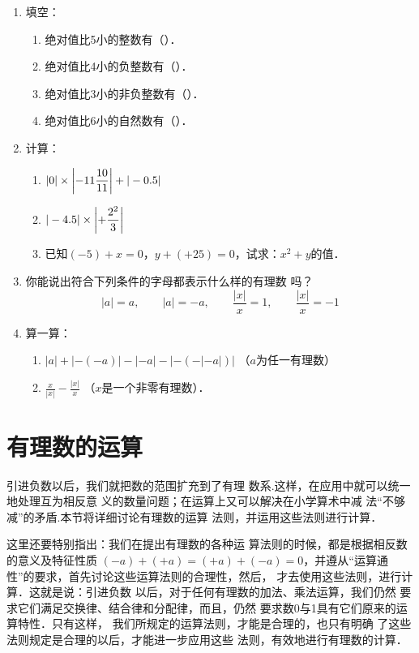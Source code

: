 \begin{enumerate}
\item 填空：
\begin{enumerate}
    \item 绝对值比5小的整数有（\qquad \qquad ）．
    \item 绝对值比4小的负整数有（\qquad \qquad ）．
    \item 绝对值比3小的非负整数有（\qquad \qquad ）．
    \item 绝对值比6小的自然数有（\qquad \qquad ）．
\end{enumerate}


\item 计算：
\begin{enumerate}
    \item $|0|\times \left|-11\dfrac{10}{11}\right|+|-0.5|$
    \item $|-4.5|\times\left|+\dfrac{2^2}{3}\right|$
    \item 已知$(-5)+x=0$，$y+(+25)=0$，试求：$x^2+y$的值．
\end{enumerate}

\item 你能说出符合下列条件的字母都表示什么样的有理数
吗？
\[|a|=a,\qquad |a|=-a,\qquad \frac{|x|}{x}=1,\qquad \frac{|x|}{x}=-1  \]

\item 算一算：
\begin{enumerate}
    \item $|a|+|-(-a)|-|-a|-|-(-|-a|)|$ （$a$为任一有理数）
    \item $\frac{x}{|x|}-\frac{|x|}{x}$ （$x$是一个非零有理数）．
\end{enumerate}

\end{enumerate}

\section{有理数的运算}
引进负数以后，我们就把数的范围扩充到了有理
数系.这样，在应用中就可以统一地处理互为相反意
义的数量问题；在运算上又可以解决在小学算术中减
法“不够减”的矛盾.本节将详细讨论有理数的运算
法则，并运用这些法则进行计算．

    这里还要特别指出：我们在提出有理数的各种运
算法则的时候，都是根据相反数的意义及特征性质
 $ (-a) + ( + a)=(+a)+(-a) = 0$，并遵从“运算通
性”的要求，首先讨论这些运算法则的合理性，然后，
才去使用这些法则，进行计算．这就是说：引进负数
以后，对于任何有理数的加法、乘法运算，我们仍然
要求它们满足交换律、结合律和分配律，而且，仍然
要求数0与1具有它们原来的运算特性．只有这样，
我们所规定的运算法则，才能是合理的，也只有明确
了这些法则规定是合理的以后，才能进一步应用这些
法则，有效地进行有理数的计算．

